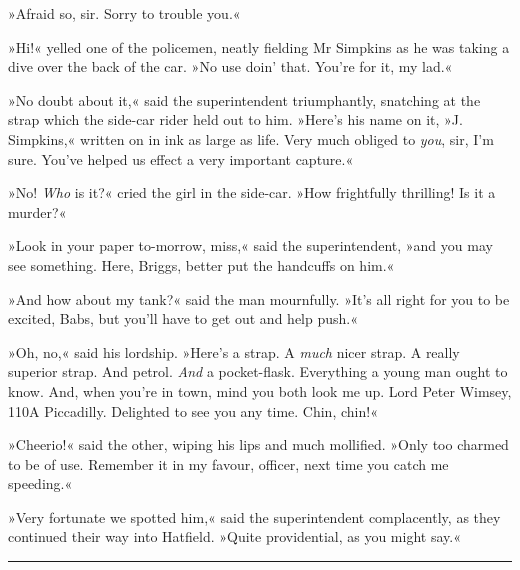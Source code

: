 »Afraid so, sir. Sorry to trouble you.«

»Hi!« yelled one of the policemen, neatly fielding Mr Simpkins as he was taking a dive over the back of the car. »No use doin' that. You're for it, my lad.«

»No doubt about it,« said the superintendent triumphantly, snatching at the strap which the side-car rider held out to him. »Here's his name on it, »J. Simpkins,« written on in ink as large as life. Very much obliged to \textit{you}, sir, I'm sure. You've helped us effect a very important capture.«

»No! \textit{Who} is it?« cried the girl in the side-car. »How frightfully thrilling! Is it a murder?«

»Look in your paper to-morrow, miss,« said the superintendent, »and you may see something. Here, Briggs, better put the handcuffs on him.«

»And how about my tank?« said the man mournfully. »It's all right for you to be excited, Babs, but you'll have to get out and help push.«

»Oh, no,« said his lordship. »Here's a strap. A \textit{much} nicer strap. A really superior strap. And petrol. \textit{And} a pocket-flask. Everything a young man ought to know. And, when you're in town, mind you both look me up. Lord Peter Wimsey, 110A Piccadilly. Delighted to see you any time. Chin, chin!«

»Cheerio!« said the other, wiping his lips and much mollified. »Only too charmed to be of use. Remember it in my favour, officer, next time you catch me speeding.«

»Very fortunate we spotted him,« said the superintendent complacently, as they continued their way into Hatfield. »Quite providential, as you might say.«

\noindent\hfil\rule{0.5\textwidth}{.4pt}\hfil 

